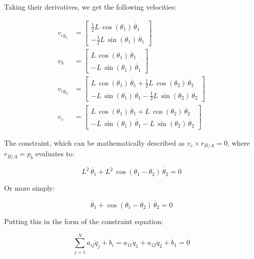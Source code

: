 \documentclass[12pt, letterpaper]{../assignment}
\begin{document}
Taking their derivatives, we get the following velocities:

\begin{equation*}
    \begin{aligned}
        v_{\text{cg}_1} &= \left[\begin{array}{c}
            \frac{1}{2}L\,\cos \left(\theta_1 \right)\,\dot{\theta_1}\\
            -\frac{1}{2}L\,\sin \left(\theta_1 \right)\,\dot{\theta_1}
            \end{array}\right]\\
        v_b &= \left[\begin{array}{c}
            L\,\cos \left(\theta_1 \right)\,\dot{\theta_1} \\
            -L\,\sin \left(\theta_1 \right)\,\dot{\theta_1} 
            \end{array}\right] \\
        v_{\text{cg}_2} &= \left[\begin{array}{c}
            L\,\cos \left(\theta_1 \right)\,\dot{\theta_1} +\frac{1}{2}L\,\cos \left(\theta_2 \right)\,\dot{\theta_2}\\
            -L\,\sin \left(\theta_1 \right)\,\dot{\theta_1} -\frac{1}{2}L\,\sin \left(\theta_2 \right)\,\dot{\theta_2}
            \end{array}\right]\\
        v_c &= \left[\begin{array}{c}
            L\,\cos \left(\theta_1 \right)\,\dot{\theta_1} +L\,\cos \left(\theta_2 \right)\,\dot{\theta_2} \\
            -L\,\sin \left(\theta_1 \right)\,\dot{\theta_1} -L\,\sin \left(\theta_2 \right)\,\dot{\theta_2} 
            \end{array}\right]
    \end{aligned}
\end{equation*}

The constraint, which can be mathematically described as
$ v_c \times r_{B/A} = 0 $, where $r_{B/A} = p_b$ evaluates to:

$$ L^2 \,\dot{\theta_1} +L^2 \,\cos \left(\theta_1 -\theta_2 \right)\,\dot{\theta_2} = 0  $$

Or more simply:

$$ \dot{\theta_1} + \cos \left(\theta_1 -\theta_2 \right)\,\dot{\theta_2} = 0  $$

Putting this in the form of the constraint equation:

$$ \sum_{j=1}^N a_{ij} \dot{q}_j + b_i =
a_{11} \dot{q}_1 + a_{12} \dot{q}_2 + b_1 = 0  $$
\end{document}
